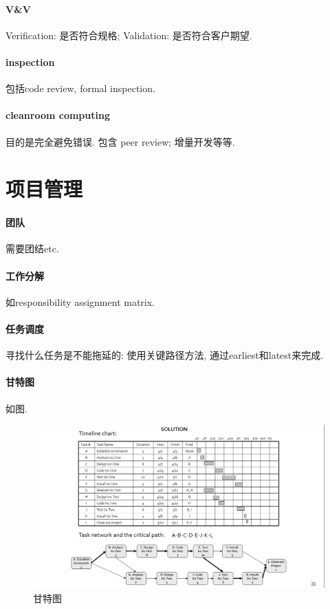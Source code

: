 \documentclass{ctexart}
\begin{document}
\paragraph{V\&V} Verification: 是否符合规格; Validation: 是否符合客户期望.
\paragraph{inspection}
    包括code review, formal inspection.
\paragraph{cleanroom computing}
    目的是完全避免错误.
    包含 peer review; 增量开发等等.\par

\section{项目管理}
\paragraph{团队} 需要团结etc.
\paragraph{工作分解} 如responsibility assignment matrix.
\paragraph{任务调度} 寻找什么任务是不能拖延的:
    使用关键路径方法, 通过earliest和latest来完成.
\paragraph{甘特图} 如图.
    \begin{figure}[ht!]
        \centering
        \includegraphics[width=\textwidth, height=\textheight, keepaspectratio]{gantt.png}
        \caption{甘特图}
    \end{figure}
\end{document}
